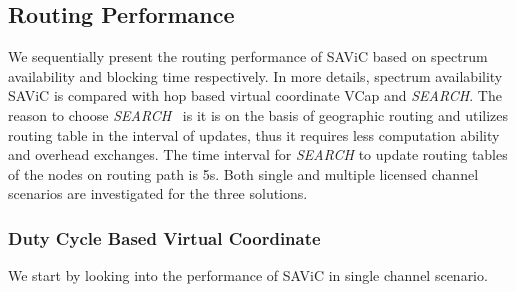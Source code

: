 \subsection{Routing Performance}
We sequentially present the routing performance of SAViC based on spectrum availability and blocking time respectively.
In more details, spectrum availability SAViC is compared with hop based virtual coordinate VCap and \textit{SEARCH}.
The reason to choose \textit{SEARCH}~\cite{search_geo_routing_chowdhury} is it is on the basis of geographic routing and utilizes routing table in the interval of updates, thus it requires less computation ability and overhead exchanges.
The time interval for \textit{SEARCH} to update routing tables of the nodes on routing path is 5s.
Both single and multiple licensed channel scenarios are investigated for the three solutions.

\subsubsection{Duty Cycle Based Virtual Coordinate} \mbox{}


We start by looking into the performance of SAViC in single channel scenario.


